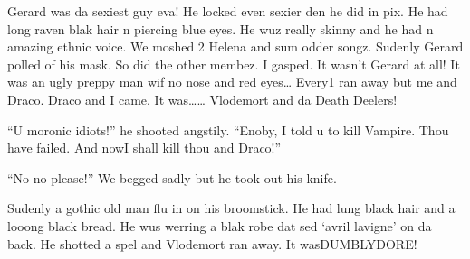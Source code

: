 Gerard was da sexiest guy eva! He locked even sexier den he did in pix. He had long raven blak hair n piercing blue eyes. He wuz really skinny and he had n amazing ethnic voice. We moshed 2 Helena and sum odder songz. Sudenly Gerard polled of his mask. So did the other membez. I gasped. It wasn't Gerard at all! It was an ugly preppy man wif no nose and red eyes\ldots{} Every1 ran away but me and Draco. Draco and I came. It was\ldots{}\ldots{} Vlodemort and da Death Deelers!

\enquote{U moronic idiots!} he shooted angstily. \enquote{Enoby, I told u to kill Vampire. Thou have failed. And now\dotfill\newline I shall kill thou and Draco!}

\enquote{No no please!} We begged sadly but he took out his knife.

Sudenly a gothic old man flu in on his broomstick. He had lung black hair and a looong black bread. He wus werring a blak robe dat sed \enquote*{avril lavigne} on da back. He shotted a spel and Vlodemort ran away. It was\dotfill DUMBLYDORE\@!
